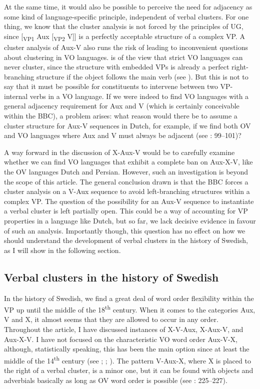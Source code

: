 \documentclass[output=paper, colorlinks, citecolor=brown]{langscibook}
\begin{document}
At the same time, it would also be possible to perceive the need for adjacency as some kind of language-specific principle, independent of verbal clusters. For one thing, we know that the cluster analysis is not forced by the principles of UG, since [\textsubscript{VP1} Aux [\textsubscript{VP2} V]] is a perfectly acceptable structure of a complex VP. A cluster analysis of Aux-V also runs the risk of leading to inconvenient questions about clustering in VO languages. \citet[343]{Haider2010} is of the view that strict VO languages can never cluster, since the structure with embedded VPs is already a perfect right-branching structure if the object follows the main verb (see ). But this is not to say that it must be possible for constituents to intervene between two VP-internal verbs in a VO language. If we were indeed to find VO languages with a general adjacency requirement for Aux and V (which is certainly conceivable within the BBC), a problem arises: what reason would there be to assume a cluster structure for Aux-V sequences in Dutch, for example, if we find both OV and VO languages where Aux and V must always be adjacent (see \citealt{Sheehan2017Final}: 99–101)?



A way forward in the discussion of X-Aux-V would be to carefully examine whether we can find VO languages that exhibit a complete ban on Aux-X-V, like the OV languages Dutch and Persian. However, such an investigation is beyond the scope of this article. The general conclusion drawn is that the BBC forces a cluster analysis on a V-Aux sequence to avoid left-branching structures within a complex VP. The question of the possibility for an Aux-V sequence to instantiate a verbal cluster is left partially open. This could be a way of accounting for VP properties in a language like Dutch, but so far, we lack decisive evidence in favour of such an analysis. Importantly though, this question has no effect on how we should understand the development of verbal clusters in the history of Swedish, as I will show in the following section.


\subsection{Verbal clusters in the history of Swedish}\label{sec:sangfelt:5.3}

In the history of Swedish, we find a great deal of word order flexibility within the VP up until the middle of the 18\textsuperscript{th} century. When it comes to the categories Aux, V and X, it almost seems that they are allowed to occur in any order. Throughout the article, I have discussed instances of X-V-Aux, X-Aux-V, and Aux-X-V. I have not focused on the characteristic VO word order Aux-V-X, although, statistically speaking, this has been the main option since at least the middle of the 14\textsuperscript{th} century (see \citealt{Delsing1999}; \citealt{Petzell2011}; \citealt{Sangfelt2019}). The pattern V-Aux-X, where X is placed to the right of a verbal cluster, is a minor one, but it can be found with objects and adverbials basically as long as OV word order is possible (see \citealt{Sangfelt2019}: 225–227).
\end{document}
